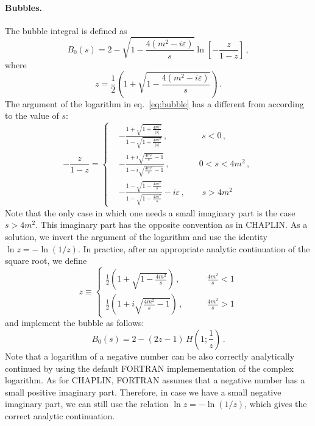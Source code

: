 \documentclass[12pt,a4wide]{article}
\begin{document}
\paragraph{Bubbles.} The bubble integral is defined as
\begin{equation}
  \label{eq:bubble}
  B_0(s)=2 -\sqrt{1-\frac{4(m^2-i\varepsilon)}{s}}\ln\left[-\frac{z}{1-z}\right]\,,
\end{equation}
where 
\begin{equation}
  \label{eq:z}
  z=\frac{1}{2}\left(1+\sqrt{1-\frac{4(m^2-i\varepsilon)}{s}}\right)\,.
\end{equation}
The argument of the logarithm in eq.~\eqref{eq:bubble} has a different
from according to the value of $s$:
\begin{equation}
  \label{eq:z-omz}
  -\frac{z}{1-z} = \left\{
    \begin{split}
      &-\frac{1+\sqrt{1+\frac{4m^2}{|s|}}}{1-\sqrt{1+\frac{4m^2}{|s|}}}\,,\qquad \qquad s<0\,,\\
        & -\frac{1+i\sqrt{\frac{4m^2}{s}-1}}{1-i\sqrt{\frac{4m^2}{s}-1}}\,,\qquad \quad\>\> 0<s<4m^2\,,\\
        &
        -\frac{1-\sqrt{1-\frac{4m^2}{s}}}{1-\sqrt{1-\frac{4m^2}{s}}}-i\varepsilon\,,\qquad
        s>4m^2
    \end{split}
\right.
\end{equation}
Note that the only case in which one needs a small imaginary part is
the case $s>4m^2$. This imaginary part has the opposite convention as
in CHAPLIN. As a solution, we invert the argument of the logarithm and
use the identity $\ln z = -\ln(1/z)$. In practice, after an appropriate analytic
continuation of the square root, we define
\begin{equation}
  \label{eq:z-implemented}
  z \equiv \left\{\begin{split}
      \frac{1}{2}\left(1+\sqrt{1-\frac{4m^2}{s}}\right)\,,& \qquad \frac{4m^2}{s}<1\\
      \frac{1}{2}\left(1+i\sqrt{\frac{4m^2}{s}-1}\right)\,,& \qquad \frac{4m^2}{s}>1
    \end{split}
    \right.
  \end{equation}
and implement the bubble as follows:
\begin{equation}
  \label{eq:bubble-implemented}
  B_0(s)=
      2 -(2 z-1) \,H\left(1;\frac{1}{z}\right) \,.
\end{equation}
Note that a logarithm of a negative number can be also correctly
analytically continued by using the default FORTRAN implemementation
of the complex logarithm. As for CHAPLIN, FORTRAN assumes that a
negative number has a small positive imaginary part. Therefore, in
case we have a small negative imaginary part, we can still use the
relation $\ln z = -\ln(1/z)$, which gives the correct analytic continuation.
\end{document}

